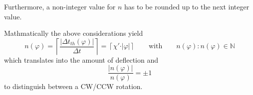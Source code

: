         Furthermore, a non-integer value for \( n \) has to be rounded up to the next integer value.\par
        Mathmatically the above considerations yield
        \begin{equation}
            n(\varphi) = \left\lceil \frac{\left\vert \Delta t_{th}(\varphi) \right\vert }{\Delta t} \right\rceil = \left\lceil \chi' \cdot \vert\varphi\vert \right\rceil \qquad \text{with} \qquad n(\varphi): n(\varphi) \in \mathbb{N}
            \label{eq:value_of_cycle_Count}
        \end{equation}
        which translates into the amount of deflection and
        \begin{equation}
            \frac{\vert n(\varphi)\vert}{n(\varphi)} = \pm 1
            \label{eq:sign_of_cycle_count}
        \end{equation}
        to distinguish between a CW/CCW rotation.
